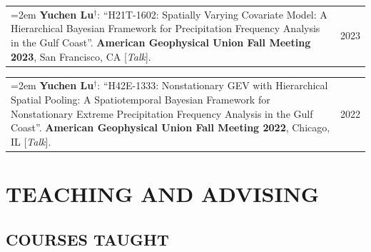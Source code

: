 \documentclass[10pt,oneside]{article}
\makeatletter
\newenvironment{alignedentrieshang}[1][2em]{%
  \noindent%
}{%
}
\newcommand{\hangingitem}[2]{%
  \noindent%
  \begin{tabular*}{\textwidth}{@{}p{0.85\textwidth}@{\extracolsep{\fill}}r@{}}%
    \hangindent=2em \hangafter=1 #1 & #2%
  \end{tabular*}%
}
\makeatother
\begin{document}
\begin{alignedentrieshang}
\hangingitem{\textcolor{RiceBlue}{\textbf{Yuchen Lu}}$^\mathbf{\dagger}$: \enquote{H21T-1602: Spatially Varying Covariate Model: A Hierarchical Bayesian Framework for Precipitation Frequency Analysis in the Gulf Coast}. \textbf{American Geophysical Union Fall Meeting 2023}, San Francisco, CA [\textit{Talk}].}{2023}







\hangingitem{\textcolor{RiceBlue}{\textbf{Yuchen Lu}}$^\mathbf{\dagger}$: \enquote{H42E-1333: Nonstationary GEV with Hierarchical Spatial Pooling: A Spatiotemporal Bayesian Framework for Nonstationary Extreme Precipitation Frequency Analysis in the Gulf Coast}. \textbf{American Geophysical Union Fall Meeting 2022}, Chicago, IL [\textit{Talk}].}{2022}


































\end{alignedentrieshang}
\section{TEACHING AND ADVISING}

\subsection{COURSES TAUGHT}
\end{document}
